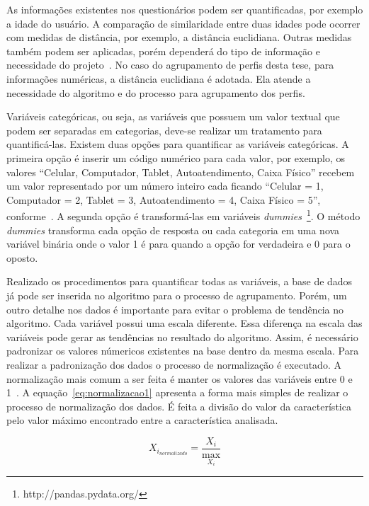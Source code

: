 As informações existentes nos questionários podem ser quantificadas, por exemplo a idade do usuário. A comparação de similaridade entre duas idades pode ocorrer com medidas de distância, por exemplo, a distância euclidiana. Outras medidas também podem ser aplicadas, porém dependerá do tipo de informação e necessidade do projeto~\cite{masiero:2011, masiero:2013}. No caso do agrupamento de perfis desta tese, para informações numéricas, a distância euclidiana é adotada. Ela atende a necessidade do algoritmo e do processo para agrupamento dos perfis.

Variáveis categóricas, ou seja, as variáveis que possuem um valor textual que podem ser separadas em categorias, deve-se realizar um tratamento para quantificá-las. Existem duas opções para quantificar as variáveis categóricas. A primeira opção é inserir um código numérico para cada valor, por exemplo, os valores ``Celular, Computador, Tablet, Autoatendimento, Caixa Físico'' recebem um valor representado por um número inteiro cada ficando ``Celular = 1, Computador = 2, Tablet = 3, Autoatendimento = 4, Caixa Físico = 5'', conforme~. A segunda opção é transformá-las em variáveis \emph{dummies}~\footnote{http://pandas.pydata.org/}. O método \emph{dummies} transforma cada opção de resposta ou cada categoria em uma nova variável binária onde o valor 1 é para quando a opção for verdadeira e 0 para o oposto.

Realizado os procedimentos para quantificar todas as variáveis, a base de dados já pode ser inserida no algoritmo para o processo de agrupamento. Porém, um outro detalhe nos dados é importante para evitar o problema de tendência no algoritmo. Cada variável possui uma escala diferente. Essa diferença na escala das variáveis pode gerar as tendências no resultado do algoritmo. Assim, é necessário padronizar os valores númericos existentes na base dentro da mesma escala. Para realizar a padronização dos dados o processo de normalização é executado. A normalização mais comum a ser feita é manter os valores das variáveis entre 0 e 1~\cite{lattin:2011}. A equação~\ref{eq:normalizacao1} apresenta a forma mais simples de realizar o processo de normalização dos dados. É feita a divisão do valor da característica pelo valor máximo encontrado entre a característica analisada.

\begin{equation}
	X_{i_{normalizado}} = \frac{X_i}{\max_{X_i}}
	\label{eq:normalizacao1}
\end{equation}

